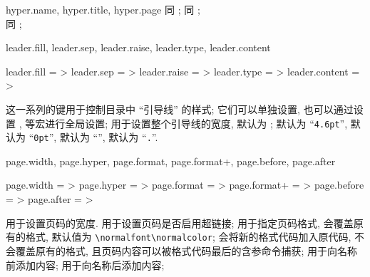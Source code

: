 \begin{keyval}{hyper.name, hyper.title, hyper.page}
   同 ;
   同 ; 
   \\ 同 ; 
\end{keyval}


\setlength{\dvalWidth}{3.5em}
\setlength{\dvalwidth}{6em}
\begin{keyval}{leader.fill, leader.sep, leader.raise, leader.type, leader.content}
  \begin{syntax}
    leader.fill    =  > \dval{\string\hfill}
    leader.sep     =  > \dval{\string\ztoc@leader@sep}
    leader.raise   =  > \dval{\string\ztoc@leader@raise}
    leader.type    =  > \dval{\string\ztoc@leader@type}
    leader.content =  > \dval{\string\ztoc@leader@content}
  \end{syntax}
  这一系列的键用于控制目录中 ``引导线'' 的样式; 它们可以单独设置, 也可以通过设置
  ,  等宏进行全局设置; 
  用于设置整个引导线的宽度, 默认为 ;
   默认为 ``\texttt{4.6pt}'',  默认为 
  ``\texttt{0pt}'',  默认为 ``\texttt{}'', 
   默认为 ``\texttt{.}''.
\end{keyval}



\begin{keyval}{page.width, page.hyper, page.format, page.format+, page.before, page.after}
  \begin{syntax}
    page.width   =  > \dval{\string\ztoc@page@width}
    page.hyper   =  > 
    page.format  =  > \dval{\string\normalfont\string\normalcolor}
    page.format+ =  > 
    page.before  =  > 
    page.after   =  > 
  \end{syntax}
   用于设置页码的宽度.  用于设置页码是否启用超链接; 
   用于指定页码格式, 会覆盖原有的格式, 默认值为 \verb|\normalfont\normalcolor|;  会将新的格式代码加入原代码,
  不会覆盖原有的格式, 且页码内容可以被格式代码最后的含参命令捕获;  用于向名称前添加内容;
   用于向名称后添加内容;
\end{keyval}
\setlength{\dvalWidth}{2.25em}
\setlength{\dvalwidth}{2em}


